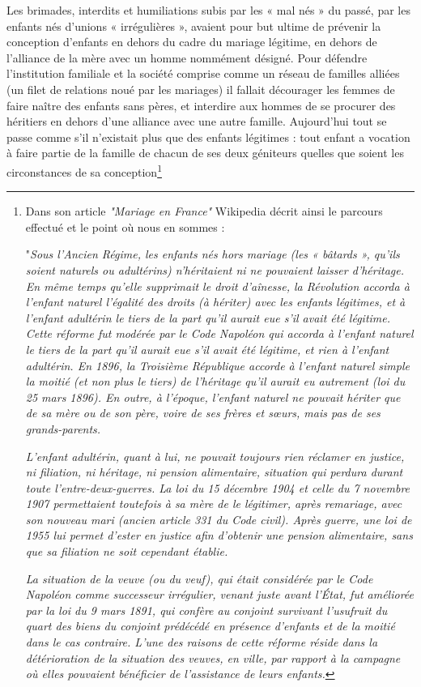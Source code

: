  Les brimades, interdits et humiliations subis par les « mal nés » du passé, par les enfants nés d'unions « irrégulières »,  avaient pour but ultime de prévenir la conception d'enfants en dehors du cadre du mariage légitime, en dehors de l'alliance de la mère avec un homme nommément désigné. Pour défendre l'institution familiale et la société comprise comme un réseau de familles alliées (un filet de relations noué par les mariages) il fallait décourager les femmes de faire naître des enfants sans pères, et interdire aux hommes de se procurer des héritiers en dehors d'une alliance avec une autre famille. Aujourd'hui tout se passe comme s'il n'existait plus que des enfants légitimes : tout enfant a vocation à faire partie de la famille de chacun de ses deux géniteurs quelles que soient les circonstances de sa conception\footnote{Dans son article \emph{ "Mariage en France"} Wikipedia décrit ainsi le parcours effectué et le point où nous en sommes : 
 
 "\emph{Sous l'Ancien Régime, les enfants nés hors mariage (les « bâtards », qu'ils soient naturels ou adultérins) n'héritaient ni ne pouvaient laisser d'héritage. En même temps qu'elle supprimait le droit d'aînesse, la Révolution accorda à l'enfant naturel l'égalité des droits (à hériter) avec les enfants légitimes, et à l'enfant adultérin le tiers de la part qu'il aurait eue s'il avait été légitime. Cette réforme fut modérée par le Code Napoléon qui accorda à l'enfant naturel le tiers de la part qu'il aurait eue s'il avait été légitime, et rien à l'enfant adultérin. En 1896, la Troisième République accorde à l'enfant naturel simple la moitié (et non plus le tiers) de l'héritage qu'il aurait eu autrement (loi du 25 mars 1896). En outre, à l'époque, l'enfant naturel ne pouvait hériter que de sa mère ou de son père, voire de ses frères et sœurs, mais pas de ses grands-parents.}

\emph{L'enfant adultérin, quant à lui, ne pouvait toujours rien réclamer en justice, ni filiation, ni héritage, ni pension alimentaire, situation qui perdura durant toute l'entre-deux-guerres. La loi du 15 décembre 1904 et celle du 7 novembre 1907 permettaient toutefois à sa mère de le légitimer, après remariage, avec son nouveau mari (ancien article 331 du Code civil). Après guerre, une loi de 1955 lui permet d'ester en justice afin d'obtenir une pension alimentaire, sans que sa filiation ne soit cependant établie.}

\emph{La situation de la veuve (ou du veuf), qui était considérée par le Code Napoléon comme successeur irrégulier, venant juste avant l'État, fut améliorée par la loi du 9 mars 1891, qui confère au conjoint survivant l’usufruit du quart des biens du conjoint prédécédé en présence d’enfants et de la moitié dans le cas contraire. L'une des raisons de cette réforme réside dans la détérioration de la situation des veuves, en ville, par rapport à la campagne où elles pouvaient bénéficier de l'assistance de leurs enfants.}

}
